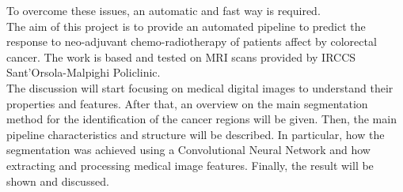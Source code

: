 \documentclass{standalone}
\begin{document}
To overcome these issues, an automatic and fast way is required.\\
The aim of this project is to provide an automated pipeline to predict the response to neo-adjuvant chemo-radiotherapy of patients affect by colorectal cancer. 
The work is based and tested on MRI scans provided by IRCCS Sant’Orsola-Malpighi Policlinic.\\
The discussion will start focusing on medical digital images to understand their properties and features.
After that, an overview on the main segmentation method for the identification of the cancer regions will be given.
Then, the main pipeline characteristics and structure will be described.
In particular, how the segmentation was achieved using a Convolutional Neural Network and how extracting and processing medical image features.
Finally, the result will be shown and discussed.
\end{document}
